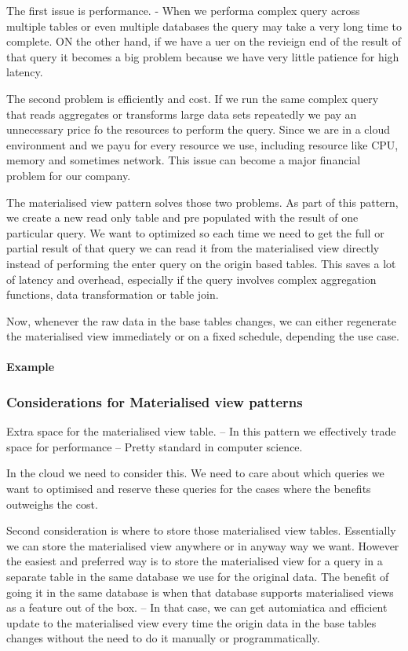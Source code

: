 \documentclass[a4paper, 11pt]{book}
\begin{document}
    The first issue is performance.
    - When we performa complex query across multiple tables or even multiple databases the query may take a very long time to complete.
    ON the other hand, if we have a uer on the revieign end of the result of that query it becomes a big problem because we have very little patience for high latency.

    The second problem is efficiently and cost.
    If we run the same complex query that reads aggregates or transforms large data sets repeatedly we pay an unnecessary price fo the resources to perform the query.
    Since we are in a cloud environment and we payu for every resource we use, including resource like CPU, memory and sometimes network. This issue can become a major financial problem for our company.

    The materialised view pattern solves those two problems.
    As part of this pattern, we create a new read only table and pre populated with the result of one particular query.
    We want to optimized so each time we need to get the full or partial result of that query we can read it from the materialised view directly instead of performing the enter query on the origin based tables.
    This saves a lot of latency and overhead, especially if the query involves complex aggregation functions, data transformation or table join.

    Now, whenever the raw data in the base tables changes, we can either regenerate the materialised view immediately or on a fixed schedule, depending the use case.

    \paragraph{Example}

    \subsubsection{Considerations for Materialised view patterns}
    Extra space for the materialised view table.
    -- In this pattern we effectively trade space for performance
    -- Pretty standard in computer science.

    In the cloud we need to consider this.
    We need to care about which queries we want to optimised and reserve these queries for the cases where the benefits outweighs the cost.

    Second consideration is where to store those materialised view tables.
    Essentially we can store the materialised view anywhere or in anyway way we want.
    However the easiest and preferred way is to store the materialised view for a query in a separate table in the same database we use for the original data.
    The benefit of going it in the same database is when that database supports materialised views as a feature out of the box.
    -- In that case, we can get automiatica and efficient update to the materialised view every time the origin data in the base tables changes without the need to do it manually or programmatically.
\end{document}
